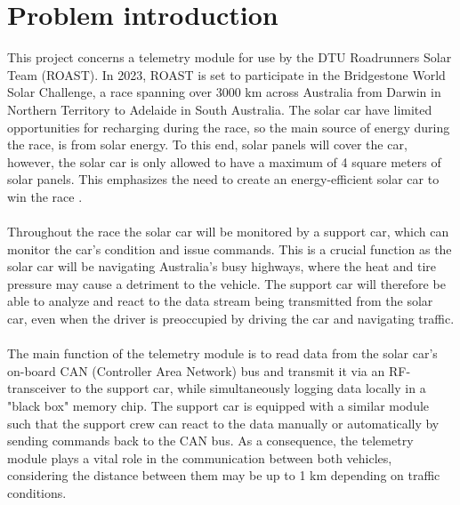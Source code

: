 \documentclass[]{article}
\begin{document}
\section{Problem introduction}

This project concerns a telemetry module for use by the DTU Roadrunners Solar Team (ROAST). In 2023, ROAST is set to participate in the Bridgestone World Solar Challenge, a race spanning over 3000 km across Australia from Darwin in Northern Territory to Adelaide in South Australia. The solar car have limited opportunities for recharging during the race, so the main source of energy during the race, is from solar energy. To this end, solar panels will cover the car, however, the solar car is only allowed to have a maximum of 4 square meters of solar panels. This emphasizes the need to create an energy-efficient solar car to win the race \cite{wsc}.\\
\\
Throughout the race the solar car will be monitored by a support car, which can monitor the car's condition and issue commands. This is a crucial function as the solar car will be navigating Australia's busy highways, where the heat and tire pressure may cause a detriment to the vehicle. The support car will therefore be able to analyze and react to the data stream being transmitted from the solar car, even when the driver is preoccupied by driving the car and navigating traffic. \\
\\
The main function of the telemetry module is to read data from the solar car's on-board CAN (Controller Area Network) bus and transmit it via an RF-transceiver to the support car, while simultaneously logging data locally in a "black box" memory chip. The support car is equipped with a similar module such that the support crew can react to the data manually or automatically by sending commands back to the CAN bus. As a consequence, the telemetry module plays a vital role in the communication between both vehicles, considering the distance between them may be up to 1 km depending on traffic conditions.\\
\end{document}
